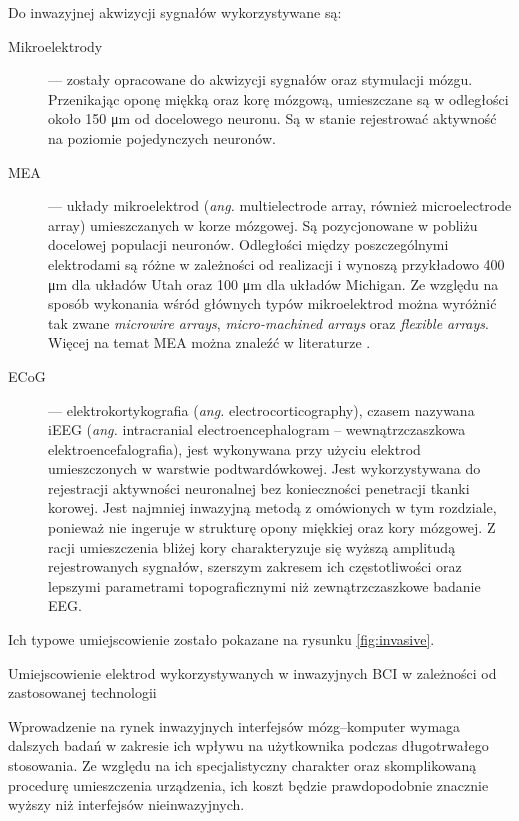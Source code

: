 \documentclass[skorowidz,skroty]{dyplomWEZUT}
\begin{document}
Do inwazyjnej akwizycji sygnałów wykorzystywane są:
\begin{description}
    \item [Mikroelektrody] --- zostały opracowane do akwizycji sygnałów oraz stymulacji mózgu. Przenikając oponę miękką oraz korę mózgową, umieszczane są w odległości około 150 μm od docelowego neuronu\cite{bci_signals_invasive}. Są w stanie rejestrować aktywność na poziomie pojedynczych neuronów.
    \item [MEA] --- układy mikroelektrod (\textit{ang.} multielectrode array, również microelectrode array) umieszczanych w korze mózgowej. Są pozycjonowane w pobliżu docelowej populacji neuronów. Odległości między poszczególnymi elektrodami są różne w zależności od realizacji i wynoszą przykładowo 400 μm dla układów Utah oraz 100 μm dla układów Michigan\cite{bci_mea}. Ze względu na sposób wykonania wśród głównych typów mikroelektrod można wyróżnić tak zwane \textit{microwire arrays}, \textit{micro-machined arrays} oraz \textit{flexible arrays}\cite{bci_mea}. Więcej na temat MEA można znaleźć w literaturze \cite{bci_signals_invasive,bci_mea,bci_principles}.
    \item [ECoG] --- elektrokortykografia (\textit{ang.} electrocorticography), czasem nazywana iEEG (\textit{ang.} intracranial electroencephalogram -- wewnątrzczaszkowa elektroencefalografia), jest wykonywana przy użyciu elektrod umieszczonych w warstwie podtwardówkowej\cite{bci_signals_invasive}. Jest wykorzystywana do rejestracji aktywności neuronalnej bez konieczności penetracji tkanki korowej. Jest najmniej inwazyjną metodą z omówionych w tym rozdziale, ponieważ nie ingeruje w strukturę opony miękkiej oraz kory mózgowej. Z racji umieszczenia bliżej kory charakteryzuje się wyższą amplitudą rejestrowanych sygnałów, szerszym zakresem ich częstotliwości oraz lepszymi parametrami topograficznymi niż zewnątrzczaszkowe badanie EEG\cite{bci_revolutionizing}.
\end{description}
Ich typowe umiejscowienie zostało pokazane na rysunku \vref{fig:invasive}.

{Umiejscowienie elektrod wykorzystywanych w inwazyjnych BCI w zależności od zastosowanej technologii\label{fig:invasive}}
{\cite{bci_signals_invasive}}

Wprowadzenie na rynek inwazyjnych interfejsów mózg--komputer wymaga dalszych badań w zakresie ich wpływu na użytkownika podczas długotrwałego stosowania\cite{bci_revolutionizing}. Ze względu na ich specjalistyczny charakter oraz skomplikowaną procedurę umieszczenia urządzenia, ich koszt będzie prawdopodobnie znacznie wyższy niż interfejsów nieinwazyjnych. 
\end{document}
